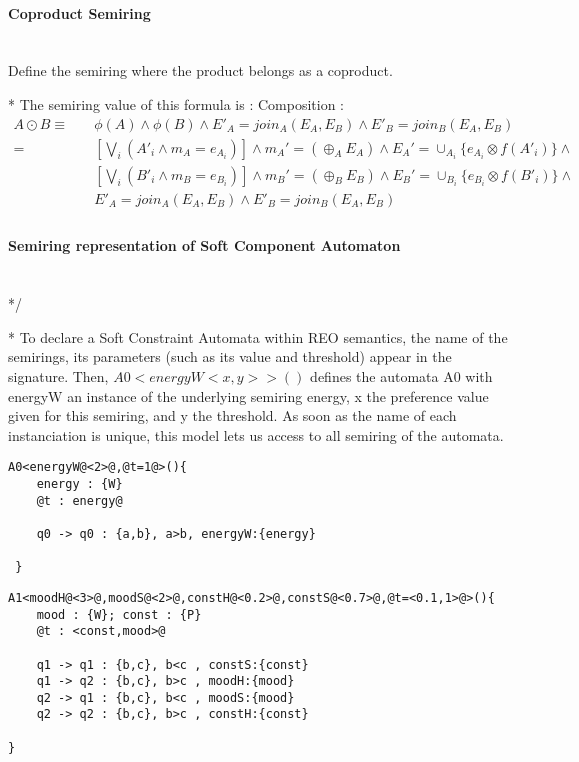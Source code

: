 \documentclass{article}
\begin{document}
\paragraph{ Coproduct Semiring} \hspace{0pt} \\
Define the semiring where the product belongs as a coproduct.


\/*
The semiring value of this formula is :
Composition :
\begin{align*}
A \odot B \equiv & \quad \phi(A) \land \phi(B) \land E'_A=join_A(E_A,E_B) \land E'_B = join_B(E_A,E_B) \\
		=  & \quad [\bigvee_i(A'_i \land m_{A}=e_{A_i})] \land m_A'= (\oplus_A E_A) \land E_A'= \cup_{A_i} \{ e_{A_i} \otimes f(A'_i)\}  \land \\
		& \quad  [\bigvee_i(B'_i \land m_{B}=e_{B_i})] \land m_B'= (\oplus_B E_B) \land E_B'= \cup_{B_i} \{ e_{B_i} \otimes f(B'_i)\} \land  \\
		& \quad E'_A=join_A(E_A,E_B) \land E'_B = join_B(E_A,E_B) \\
\end{align*}

\paragraph{Semiring representation of Soft Component Automaton} \hspace{0pt} \\
*/

\/*
\noindent
To declare a Soft Constraint Automata within REO semantics, the name of the semirings, its parameters (such as its value and threshold) appear in the signature. Then, $A0<energyW<x,y>>(){}$ defines the automata A0 with energyW an instance of the underlying semiring energy, x the preference value given for this semiring, and y the threshold. As soon as the name of each instanciation is unique, this model lets us access to all semiring of the automata.
\begin{lstlisting}[frame=single,style=base] 
A0<energyW@<2>@,@t=1@>(){
    energy : {W}
    @t : energy@

    q0 -> q0 : {a,b}, a>b, energyW:{energy} 

 }
\end{lstlisting}
\begin{lstlisting}[frame=single,style=base] 
A1<moodH@<3>@,moodS@<2>@,constH@<0.2>@,constS@<0.7>@,@t=<0.1,1>@>(){
    mood : {W}; const : {P}
    @t : <const,mood>@

    q1 -> q1 : {b,c}, b<c , constS:{const}
    q1 -> q2 : {b,c}, b>c , moodH:{mood}
    q2 -> q1 : {b,c}, b<c , moodS:{mood}
    q2 -> q2 : {b,c}, b>c , constH:{const}

}
\end{lstlisting}
\end{document}
